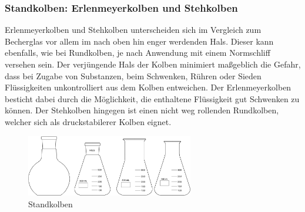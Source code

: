 \subsubsection*{Standkolben: Erlenmeyerkolben und Stehkolben}
Erlenmeyerkolben und Stehkolben unterscheiden sich im Vergleich zum Becherglas vor allem im nach oben hin enger werdenden Hals. Dieser kann ebenfalls, wie bei Rundkolben, je nach Anwendung mit einem Normschliff versehen sein. Der verjüngende Hals der Kolben minimiert maßgeblich die Gefahr, dass bei Zugabe von Substanzen, beim Schwenken, Rühren oder Sieden Flüssigkeiten unkontrolliert aus dem Kolben entweichen. 
Der Erlenmeyerkolben besticht dabei durch die Möglichkeit, die enthaltene Flüssigkeit gut Schwenken zu können. Der Stehkolben hingegen ist einen nicht weg rollenden Rundkolben, welcher sich als druckstabilerer Kolben eignet.

\begin{figure}[h!]
	\centering
	\includegraphics[width=0.65\textwidth]{img/standkolben}
	\caption{Standkolben}
	\label{fig:standkolben}
\end{figure}
\FloatBarrier

\begin{table}[h!]
	\renewcommand*{\arraystretch}{1.2}
	\centering
	\caption{Vergleich von Becherglas, Rund- und Standkolben}
	\label{tab:vergleich_becherglas}
\end{table}%
\FloatBarrier


